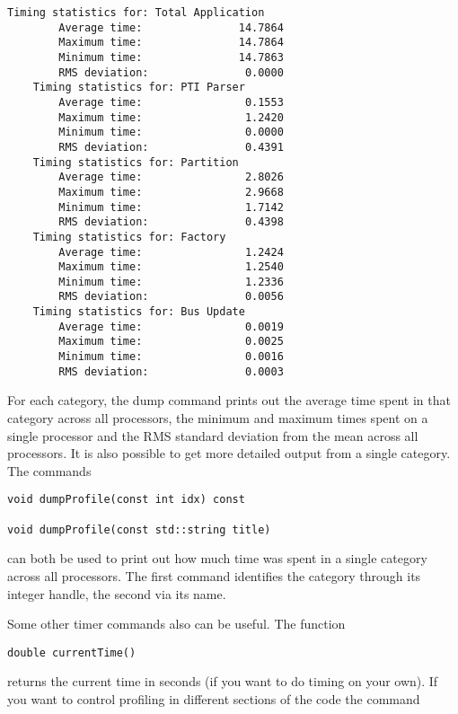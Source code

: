 {
\color{red}
\begin{Verbatim}[fontseries=b]
    Timing statistics for: Total Application
        Average time:               14.7864
        Maximum time:               14.7864
        Minimum time:               14.7863
        RMS deviation:               0.0000
    Timing statistics for: PTI Parser
        Average time:                0.1553
        Maximum time:                1.2420
        Minimum time:                0.0000
        RMS deviation:               0.4391
    Timing statistics for: Partition
        Average time:                2.8026
        Maximum time:                2.9668
        Minimum time:                1.7142
        RMS deviation:               0.4398
    Timing statistics for: Factory
        Average time:                1.2424
        Maximum time:                1.2540
        Minimum time:                1.2336
        RMS deviation:               0.0056
    Timing statistics for: Bus Update
        Average time:                0.0019
        Maximum time:                0.0025
        Minimum time:                0.0016
        RMS deviation:               0.0003
\end{Verbatim}
}


For each category, the dump command prints out the average time spent in that category across all processors, the minimum and maximum times spent on a single processor and the RMS standard deviation from the mean across all processors. It is also possible to get more detailed output from a single category. The commands

{
\color{red}
\begin{Verbatim}[fontseries=b]
void dumpProfile(const int idx) const

void dumpProfile(const std::string title)
\end{Verbatim}
}

can both be used to print out how much time was spent in a single category across all processors. The first command identifies the category through its integer handle, the second via its name.

Some other timer commands also can be useful. The function

{
\color{red}
\begin{Verbatim}[fontseries=b]
double currentTime()
\end{Verbatim}
}

returns the current time in seconds (if you want to do timing on your own). If
you want to control profiling in different sections of the code the command

